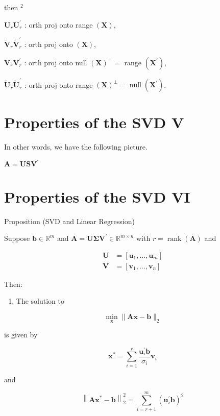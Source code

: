 \documentclass[11pt]{article}
\theoremstyle{plain} %
\theoremstyle{remark}
\begin{document}
then ${ }^{2}$

$\mathbf{U}_{r} \mathbf{U}_{r}^{\prime}$ : orth proj onto range $(\mathbf{X})$,

$\widetilde{\mathbf{V}}_{r} \widetilde{\mathbf{V}}_{r}^{\prime}$ : orth proj onto $(\mathbf{X})$,

$\mathbf{V}_{r} \mathbf{V}_{r}^{\prime}$ : orth proj onto null $(\mathbf{X})^{\perp}=$ range $\left(\mathbf{X}^{\prime}\right)$,

$\widetilde{\mathbf{U}}_{r} \widetilde{\mathbf{U}}_{r}^{\prime}$ : orth proj onto range $(\mathbf{X})^{\perp}=\operatorname{null}\left(\mathbf{X}^{\prime}\right)$.

\section*{Properties of the SVD V}
In other words, we have the following picture.

$\mathbf{A}=\mathbf{U S V}^{\prime}$


\section*{Properties of the SVD VI}
Proposition (SVD and Linear Regression)

Suppose $\mathbf{b} \in \mathbb{R}^{m}$ and $\mathbf{A}=\mathbf{U} \boldsymbol{\Sigma} \mathbf{V}^{\prime} \in \mathbb{R}^{m \times n}$ with $r=\operatorname{rank}(\mathbf{A})$ and

$$
\begin{aligned}
\mathbf{U} & =\left[\mathbf{u}_{1}, \ldots, \mathbf{u}_{m}\right] \\
\mathbf{V} & =\left[\mathbf{v}_{1}, \ldots, \mathbf{v}_{n}\right]
\end{aligned}
$$

Then:

\begin{enumerate}
  \item The solution to
\end{enumerate}

$$
\min _{\mathbf{x}}\|\mathbf{A} \mathbf{x}-\mathbf{b}\|_{2}
$$

is given by

$$
\mathbf{x}^{*}=\sum_{i=1}^{r} \frac{\mathbf{u}_{i}^{\prime} \mathbf{b}}{\sigma_{i}} \mathbf{v}_{i}
$$

and

$$
\left\|\mathbf{A x}^{*}-\mathbf{b}\right\|_{2}^{2}=\sum_{i=r+1}^{m}\left(\mathbf{u}_{i}^{\prime} \mathbf{b}\right)^{2}
$$
\end{document}
